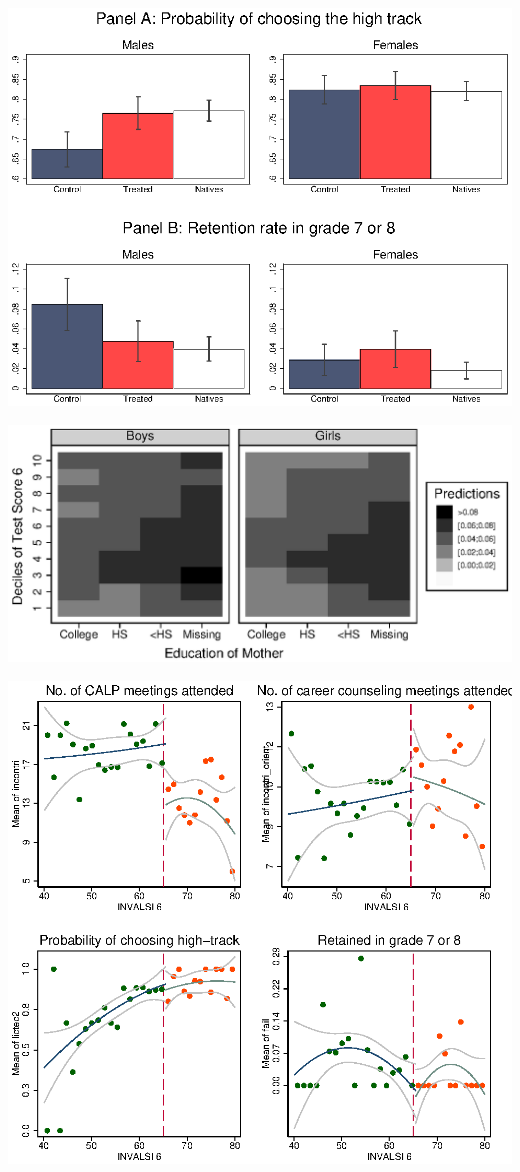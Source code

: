 \documentclass[12pt]{article}
\begin{document}
\includegraphics[scale=1.3]{figure_treatmenteffects_f.eps}

\includegraphics[scale=1.2]{Figure_heatmap1_f.eps}

\includegraphics[scale=1.2]{figure_discontinuity_a_f.eps}
\end{document}
